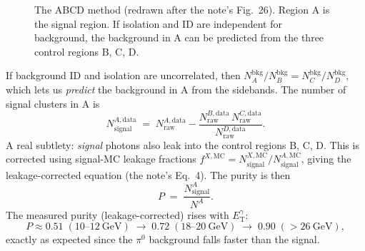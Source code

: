 \documentclass[11pt]{article}
\newcommand{\ETg}{E_{\mathrm{T}}^{\gamma}}
\newcommand{\Eiso}{E_{\mathrm{T}}^{\mathrm{iso}}}
\begin{document}
\begin{figure}[h]
\centering
{}
\caption{The ABCD method (redrawn after the note's Fig.~26). Region A is the signal region.
If isolation and ID are independent for background, the background in A can be predicted from the
three control regions B, C, D.}
\end{figure}

If background ID and isolation are uncorrelated, then $N_A^{\mathrm{bkg}}/N_B^{\mathrm{bkg}}
= N_C^{\mathrm{bkg}}/N_D^{\mathrm{bkg}}$, which lets us \emph{predict} the background in A from the
sidebands. The number of signal clusters in A is
\begin{equation}
  N^{A,\mathrm{data}}_{\mathrm{signal}} \;=\;
  N^{A,\mathrm{data}}_{\mathrm{raw}} - \frac{N^{B,\mathrm{data}}_{\mathrm{raw}}\,
  N^{C,\mathrm{data}}_{\mathrm{raw}}}{N^{D,\mathrm{data}}_{\mathrm{raw}}}.
\end{equation}
A real subtlety: \emph{signal} photons also leak into the control regions B, C, D. This is corrected
using signal-MC leakage fractions $f^{X,\mathrm{MC}}=N^{X,\mathrm{MC}}_{\mathrm{signal}}/N^{A,\mathrm{MC}}_{\mathrm{signal}}$,
giving the leakage-corrected equation (the note's Eq.~4). The purity is then
\begin{equation}
  P \;=\; \frac{N^A_{\mathrm{signal}}}{N^A}.
\end{equation}
The measured purity (leakage-corrected) rises with $\ETg$:
\[
  P \approx 0.51 \;(10\text{--}12~\text{GeV}) \;\to\; 0.72 \;(18\text{--}20~\text{GeV})
    \;\to\; 0.90 \;(>26~\text{GeV}),
\]
exactly as expected since the $\pi^0$ background falls faster than the signal.
\end{document}
